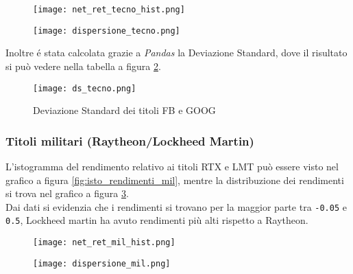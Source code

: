 \begin{figure}[h]
  \centering
  \begin{minipage}{.5\textwidth}
    \centering
    \texttt{[image: net\_ret\_tecno\_hist.png]}
    \label{fig:isto_rendimenti_tecno}
  \end{minipage}%
  \begin{minipage}{.5\textwidth}
    \centering
    \texttt{[image: dispersione\_tecno.png]}
    \label{fig:dispersione_tecno}
  \end{minipage}
\end{figure}

Inoltre é stata calcolata grazie a \emph{Pandas} la Deviazione Standard, dove il risultato si può vedere nella tabella a figura \ref{fig:ds_tecno}.

\begin{figure}[h]
  \centering
  \texttt{[image: ds\_tecno.png]}
  \caption{Deviazione Standard dei titoli FB e GOOG}
  \label{fig:ds_tecno}
\end{figure}

\subsubsection{Titoli militari (Raytheon/Lockheed Martin)}

L'istogramma del rendimento relativo ai titoli RTX e LMT può essere visto nel grafico a figura \ref{fig:isto_rendimenti_mil}, mentre la distribuzione dei rendimenti
si trova nel grafico a figura \ref{fig:dispersione_mil}.\\
Dai dati si evidenzia che i rendimenti si trovano per la maggior parte tra \verb|-0.05| e \verb|0.5|, Lockheed martin ha avuto rendimenti più alti rispetto
a Raytheon.

\begin{figure}[h]
  \centering
  \begin{minipage}{.5\textwidth}
    \centering
    \texttt{[image: net\_ret\_mil\_hist.png]}
    \label{fig:isto_rendimenti_mil}
  \end{minipage}%
  \begin{minipage}{.5\textwidth}
    \centering
    \texttt{[image: dispersione\_mil.png]}
    \label{fig:dispersione_mil}
  \end{minipage}
\end{figure}

